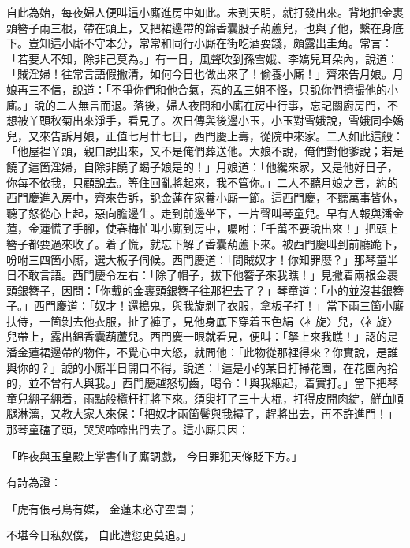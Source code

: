 \begin{showcontents}{}
自此為始，每夜婦人便叫這小廝進房中如此。未到天明，就打發出來。背地把金裹頭簪子兩三根，帶在頭上，又把裙邊帶的錦香囊股子葫蘆兒，也與了他，繫在身底下。豈知這小廝不守本分，常常和同行小廝在街吃酒耍錢，頗露出圭角。常言：「若要人不知，除非己莫為。」有一日，風聲吹到孫雪娥、李嬌兒耳朵內，說道：「賊淫婦！往常言語假撇清，如何今日也做出來了！偷養小廝！」齊來告月娘。月娘再三不信，說道：「不爭你們和他合氣，惹的孟三姐不怪，只說你們擠撮他的小廝。」說的二人無言而退。落後，婦人夜間和小廝在房中行事，忘記關廚房門，不想被丫頭秋菊出來淨手，看見了。次日傳與後邊小玉，小玉對雪娥說，雪娥同李嬌兒，又來告訴月娘，正值七月廿七日，西門慶上壽，從院中來家。二人如此這般：「他屋裡丫頭，親口說出來，又不是俺們葬送他。大娘不說，俺們對他爹說；若是饒了這箇淫婦，自除非饒了蝎子娘是的！」月娘道：「他纔來家，又是他好日子，你每不依我，只顧說去。等住回亂將起來，我不管你。」二人不聽月娘之言，約的西門慶進入房中，齊來告訴，說金蓮在家養小廝一節。這西門慶，不聽萬事皆休，聽了怒從心上起，惡向膽邊生。走到前邊坐下，一片聲叫琴童兒。早有人報與潘金蓮，金蓮慌了手腳，使春梅忙叫小廝到房中，囑咐：「千萬不要說出來！」把頭上簪子都要過來收了。着了慌，就忘下解了香囊葫蘆下來。被西門慶叫到前廳跪下，吩咐三四箇小廝，選大板子伺候。西門慶道：「問賊奴才！你知罪麼？」那琴童半日不敢言語。西門慶令左右：「除了帽子，拔下他簪子來我瞧！」見撇着兩根金裹頭銀簪子，因問：「你戴的金裹頭銀簪子往那裡去了？」琴童道：「小的並沒甚銀簪子。」西門慶道：「奴才！還搗鬼，與我旋剝了衣服，拿板子打！」當下兩三箇小廝扶侍，一箇剝去他衣服，扯了褲子，見他身底下穿着玉色絹〈衤旋〉兒，〈衤旋〉兒帶上，露出錦香囊葫蘆兒。西門慶一眼就看見，便叫：「拏上來我瞧！」認的是潘金蓮裙邊帶的物件，不覺心中大怒，就問他：「此物從那裡得來？你實說，是誰與你的？」諕的小廝半日開口不得，說道：「這是小的某日打掃花園，在花園內拾的，並不曾有人與我。」西門慶越怒切齒，喝令：「與我綑起，着實打。」當下把琴童兒綳子綳着，雨點般欖杆打將下來。須臾打了三十大棍，打得皮開肉綻，鮮血順腿淋漓，又教大家人來保：「把奴才兩箇鬢與我撏了，趕將出去，再不許進門！」那琴童磕了頭，哭哭啼啼出門去了。這小廝只因：

「昨夜與玉皇殿上掌書仙子廝調戲，  今日罪犯天條貶下方。」

有詩為證：

「虎有倀弓鳥有媒，  金蓮未必守空閨；

不堪今日私奴僕，  自此遭愆更莫追。」


\end{showcontents}
